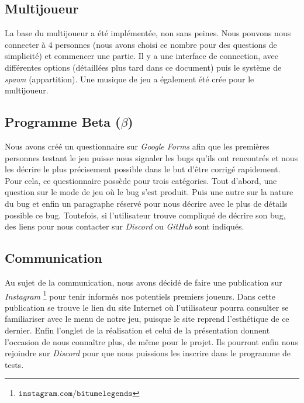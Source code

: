 \documentclass[12pt,a4paper]{article}
\begin{document}
    \subsection{Multijoueur}
        La base du multijoueur a été implémentée, non sans peines. 
        Nous pouvons nous connecter à 4 personnes (nous avons choisi ce nombre pour des questions 
        de simplicité) et commencer une partie. Il y a une interface de connection, avec différentes 
        options (détaillées plus tard dans ce document) puis le système de \textit{spawn} (appartition).
        Une musique de jeu a également été crée pour le multijoueur.
  
    \subsection{Programme Beta (\(\beta\))}
        Nous avons créé un questionnaire sur \textsl{Google Forms} afin que les premières personnes testant
        le jeu puisse nous signaler les bugs qu'ils ont rencontrés et nous les décrire le plus 
        précisement possible dans le but d'être corrigé rapidement. Pour cela, ce questionnaire 
        possède pour trois catégories. Tout d'abord, une question sur le mode de jeu où le bug 
        s'est produit. Puis une autre sur la nature du bug et enfin un paragraphe réservé
        pour nous décrire avec le plus de détails possible ce bug. Toutefois, si l'utilisateur
        trouve compliqué de décrire son bug, des liens pour nous contacter sur \textsl{Discord} 
        ou \textsl{GitHub} sont indiqués.
  
    \subsection{Communication}
        Au sujet de la communication, nous avons décidé de faire une publication sur \textsl{Instagram}
        \footnote{\(\mathtt{instagram.com/bitumelegends}\)}
        pour tenir informés nos potentiels premiers joueurs. Dans cette publication se trouve le lien 
        du site Internet où l'utilisateur pourra consulter se familiariser avec le menu de notre
        jeu, puisque le site reprend l'esthétique de ce dernier. Enfin l'onglet de la réalisation
        et celui de la présentation donnent l'occasion de nous connaître plus, de même pour le projet.
        Ils pourront enfin nous rejoindre sur \textsl{Discord} pour que nous puissions les inscrire dans le
        programme de tests.
  
\end{document}

